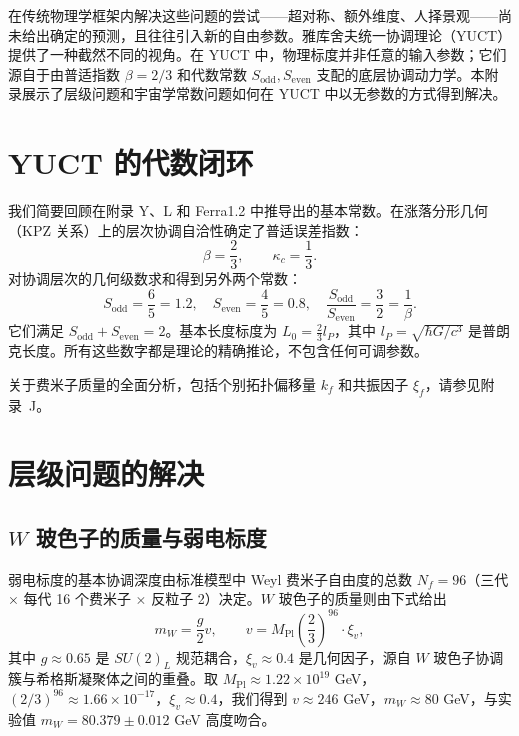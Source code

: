\documentclass[11pt,a4paper]{article}
\theoremstyle{remark}
\begin{document}
	在传统物理学框架内解决这些问题的尝试——超对称、额外维度、人择景观——尚未给出确定的预测，且往往引入新的自由参数。雅库舍夫统一协调理论（YUCT）提供了一种截然不同的视角。在 YUCT 中，物理标度并非任意的输入参数；它们源自于由普适指数 \(\beta = 2/3\) 和代数常数 \(S_{\mathrm{odd}}, S_{\mathrm{even}}\) 支配的底层协调动力学。本附录展示了层级问题和宇宙学常数问题如何在 YUCT 中以无参数的方式得到解决。
	
	\section{YUCT 的代数闭环}
	
	我们简要回顾在附录 Y、L 和 Ferra1.2 中推导出的基本常数。在涨落分形几何（KPZ 关系）上的层次协调自洽性确定了普适误差指数：
	\begin{equation}
		\beta = \frac{2}{3}, \qquad \kappa_c = \frac{1}{3}.
	\end{equation}
	对协调层次的几何级数求和得到另外两个常数：
	\begin{equation}
		S_{\mathrm{odd}} = \frac{6}{5} = 1.2, \quad S_{\mathrm{even}} = \frac{4}{5} = 0.8, \quad \frac{S_{\mathrm{odd}}}{S_{\mathrm{even}}} = \frac{3}{2} = \frac{1}{\beta}.
	\end{equation}
	它们满足 \(S_{\mathrm{odd}} + S_{\mathrm{even}} = 2\)。基本长度标度为 \(L_0 = \frac{2}{3} l_P\)，其中 \(l_P = \sqrt{\hbar G / c^3}\) 是普朗克长度。所有这些数字都是理论的精确推论，不包含任何可调参数。
	
	关于费米子质量的全面分析，包括个别拓扑偏移量 \(k_f\) 和共振因子 \(\xi_f\)，请参见附录~J。
	
	\section{层级问题的解决}
	
	\subsection{\(W\) 玻色子的质量与弱电标度}
	
	弱电标度的基本协调深度由标准模型中 Weyl 费米子自由度的总数 \(N_f = 96\)（三代 \(\times\) 每代 16 个费米子 \(\times\) 反粒子 2）决定。\(W\) 玻色子的质量则由下式给出
	\begin{equation}
		m_W = \frac{g}{2} v, \qquad v = M_{\mathrm{Pl}} \left( \frac{2}{3} \right)^{96} \cdot \xi_v,
		\label{eq:mw_yuct}
	\end{equation}
	其中 \(g \approx 0.65\) 是 \(SU(2)_L\) 规范耦合，\(\xi_v \approx 0.4\) 是几何因子，源自 \(W\) 玻色子协调簇与希格斯凝聚体之间的重叠。取 \(M_{\mathrm{Pl}} \approx 1.22\times10^{19}\) GeV，\((2/3)^{96} \approx 1.66\times10^{-17}\)，\(\xi_v \approx 0.4\)，我们得到 \(v \approx 246\) GeV，\(m_W \approx 80\) GeV，与实验值 \(m_W = 80.379 \pm 0.012\) GeV 高度吻合。
	
\end{document}
